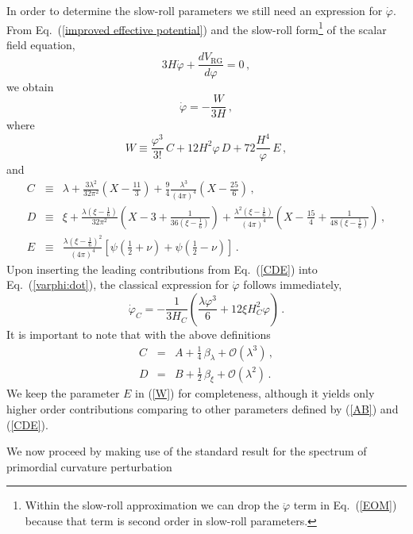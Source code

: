 In order to determine the slow-roll parameters we still need
an expression for $\dot{\varphi}$.
 From Eq.~(\ref{improved effective potential}) and the slow-roll
form\footnote{Within the slow-roll approximation we can drop the
$\ddot{\varphi}$ term in Eq.~(\ref{EOM}) because that term is second
order in slow-roll parameters.} of the scalar field equation,
\begin{equation}
3H\dot{\varphi} + \frac{dV_{\mathrm{RG}}}{d\varphi} =
0\,,\label{EOM}
\end{equation}
we obtain
\begin{equation}
\dot{\varphi} = - \frac{W}{3H}
\,,
\label{varphi:dot}
\end{equation}
where
\begin{equation}
W \equiv \frac{\varphi^3}{3!}\, C + 12H^2\varphi\, D
+72\frac{H^4}{\varphi}\, E\,,
\label{W}
\end{equation}
and
\begin{eqnarray}
 C & \equiv & \lambda + \frac{3\lambda^2}{32\pi^2}\left(X-\frac{11}{3}\right) + \frac{9}{4}\frac{\lambda^3}{(4\pi)^4}\left(X-\frac{25}{6}\right)\,,\nonumber\\
 D & \equiv & \xi
 +\frac{\lambda(\xi-\frac16)}{32\pi^2}\left(X-3+\frac{1}{36(\xi-\frac16)}\right)+\frac{\lambda^2(\xi-\frac16)}{(4\pi)^4}\left(X-\frac{15}{4}+\frac{1}{48(\xi-\frac16)} \right)\,,\nonumber\\
 E & \equiv & \frac{\lambda(\xi-\frac16)^2}{(4\pi)^4}\left[\psi\left(\frac12+\nu\right) +
  \psi\left(\frac12-\nu\right)\right]\,.
\label{CDE}
\end{eqnarray}
Upon inserting the leading contributions from
Eq.~(\ref{CDE}) into Eq.~(\ref{varphi:dot}),
 the classical expression for $\dot{\varphi}$ follows immediately,
\begin{equation}
\dot{\varphi}_C =
-\frac{1}{3H_C}\left(\frac{\lambda\varphi^3}{6}+12\xi
H^2_C\varphi\right)
\,.
\end{equation}
It is important to note that with the above definitions
\begin{eqnarray}
C & = & A + \frac14\,\beta_{\lambda} + \mathcal{O}(\lambda^3)\,,\nonumber\\
D & = & B + \frac12\,\beta_{\xi} + \mathcal{O}(\lambda^2)\,.
\end{eqnarray}
We keep the parameter $E$ in (\ref{W}) for completeness, although it
yields only higher order contributions comparing to other
parameters defined by (\ref{AB}) and (\ref{CDE}).

We now proceed by making use of the standard result for the spectrum
of primordial curvature perturbation~\cite{Liddle:2000cg}

